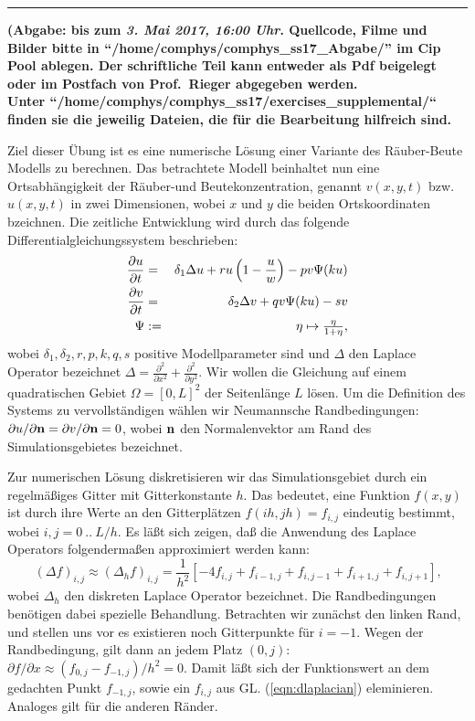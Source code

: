\documentclass[english,10pt]{exam}
\begin{document}
\vspace*{-0.5cm}\hrule
\begin{center} 
{\bfseries \sf(Abgabe: bis zum \textit{3. Mai 2017, 16:00 Uhr}.
Quellcode, Filme und Bilder bitte in ``/home/comphys/comphys\_ss17\_Abgabe/'' im Cip Pool ablegen.
Der schriftliche Teil kann entweder als Pdf beigelegt oder im Postfach von Prof.~Rieger abgegeben werden.
\\
Unter ``/home/comphys/comphys\_ss17/exercises\_supplemental/`` finden sie die jeweilig Dateien, die 
f\"ur die Bearbeitung hilfreich sind.}\\[.3cm]
\end{center}

Ziel dieser Übung ist es eine numerische Lösung einer Variante des Räuber-Beute Modells zu berechnen.
Das betrachtete Modell beinhaltet nun eine Ortsabhängigkeit der Räuber-und
Beutekonzentration, genannt  $v(x, y, t)$ bzw. $u(x, y, t)$ in zwei Dimensionen, wobei $x$ und $y$ die beiden Ortskoordinaten
bzeichnen. Die zeitliche Entwicklung wird durch das folgende
Differentialgleichungssystem beschrieben:
\begin{eqnarray}
\label{eqn:rb}
\frac{\partial u}{\partial t} &=& \delta_1 \Delta u + r u \left(1 - \frac{u}{w} \right) - p v \Psi(k u) \\
\frac{\partial v}{\partial t} &=& \delta_2 \Delta v + q v \Psi(k u) - s v \notag \\
\Psi &:=& \eta \mapsto \tfrac{\eta}{1+\eta} \notag\text{,}
\end{eqnarray}
wobei $\delta_1, \delta_2, r, p, k, q, s$ positive Modellparameter sind und 
$\Delta$ den Laplace Operator bezeichnet $\Delta = 
\frac{\partial^2}{\partial x^2} + \frac{\partial^2}{\partial y^2}$. Wir wollen 
die Gleichung auf einem quadratischen Gebiet $\Omega = [0, L]^2$ der Seitenlänge 
$L$ lösen. Um die Definition des Systems zu vervollständigen wählen wir 
Neumannsche Randbedingungen: $\partial u/\partial {\bf n} = \partial v/\partial 
{\bf n} = 0$, wobei ${\bf n}$ den Normalenvektor am Rand des Simulationsgebietes 
bezeichnet.

Zur numerischen Lösung diskretisieren wir das Simulationsgebiet durch ein regelmäßiges Gitter mit
Gitterkonstante $h$. Das bedeutet, eine Funktion $f(x, y)$ ist durch ihre Werte an den Gitterplätzen
$f(i h, j h) = f_{i,j}$ eindeutig bestimmt, wobei $i,j = 0\ ..\ L/h$. Es läßt sich zeigen, daß die
Anwendung des Laplace Operators folgendermaßen approximiert werden kann:
\begin{equation}
\label{eqn:dlaplacian}
(\Delta f)_{i,j} \approx (\Delta_h f)_{i,j} = \frac{1}{h^2} [ -4 f_{i,j} + f_{i-1,j} + f_{i,j-1} + f_{i+1,j} + f_{i,j+1} ]\text{,}
\end{equation}
wobei $\Delta_h$ den diskreten Laplace Operator bezeichnet.
Die Randbedingungen benötigen dabei spezielle Behandlung. Betrachten wir zunächst den linken Rand, und
stellen uns vor es existieren noch Gitterpunkte für $i = -1$. Wegen der Randbedingung, gilt dann an
jedem Platz $(0,j)$: $\partial f/\partial x \approx (f_{0,j} - f_{-1,j})/h^2 = 0$. Damit läßt sich
der Funktionswert an dem gedachten Punkt $f_{-1,j}$, sowie ein $f_{i,j}$ aus GL. (\ref{eqn:dlaplacian})
eleminieren. Analoges gilt für die anderen Ränder.
\end{document}
